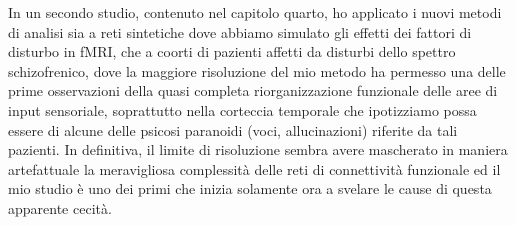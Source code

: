 In un secondo studio, contenuto nel capitolo quarto, ho applicato i nuovi metodi di analisi sia a reti sintetiche dove abbiamo simulato gli effetti dei fattori di disturbo in fMRI, che a coorti di pazienti affetti da disturbi dello spettro schizofrenico, dove la maggiore risoluzione del mio metodo ha permesso una delle prime osservazioni della quasi completa riorganizzazione funzionale delle aree di input sensoriale, soprattutto nella corteccia temporale che ipotizziamo possa essere di alcune delle psicosi paranoidi (voci, allucinazioni)  riferite da tali pazienti.
In definitiva, il limite di risoluzione sembra avere mascherato in maniera artefattuale la meravigliosa complessità delle reti di connettività funzionale ed il mio studio è uno dei primi che inizia solamente ora a svelare le cause di questa apparente cecità.

